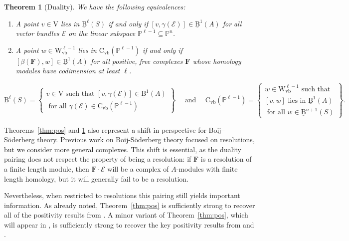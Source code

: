 \documentclass[12pt]{amsart}
\newtheorem{thm}[lemma]{Theorem}
\theoremstyle{definition}
\theoremstyle{remark}
\newcommand{\PP}{\mathbb{P}}
\newcommand{\VV}{\mathrm{V}}
\newcommand{\Wvb}{\mathrm{W}_{\text{vb}}}
\newcommand{\cE}{\mathcal{E}}
\newcommand{\FF}{\mathbf{F}}
\newcommand{\CvbQ}{\mathrm{C}_{\text{vb}}}
\newcommand{\BBQ}{\underline{\mathrm{B}}}
\begin{document}
\begin{thm}[Duality]\label{thm:dual}
We have the following equivalences:
\begin{enumerate}
	\item  A point $v\in \VV$ lies in $\BBQ^{\ell}(S)$ if and only if $[v,\gamma(\cE)]\in \BBQ^1(A)$ for all vector bundles $\cE$ on the linear subspace $\PP^{\ell-1}\subseteq \PP^n$.
	\item  A point $w\in \Wvb^{\ell-1}$ lies in $\CvbQ(\PP^{\ell-1})$ if and only if $[\beta(\FF),w]\in \BBQ^1(A)$ for all positive, free complexes $\FF$ whose homology modules have codimension at least $\ell$.
\end{enumerate}
\[
\BBQ^{\ell}(S)
=\left\{ \begin{matrix} v\in \VV  \text{ such that } [v,\gamma(\cE)]\in \BBQ^1(A) \\ \text{ for all } \gamma(\cE)\in \CvbQ(\PP^{\ell-1})\end{matrix} \right\}
\quad
\text{ and }
\quad
\CvbQ(\PP^{\ell-1})=\left\{ \begin{matrix} w\in \Wvb ^{\ell-1} \text{ such that }  \\ [v,w] \text{ lies in } \BBQ^1(A) \\  \text{ for all } w\in \BBQ^{n+1}(S)\end{matrix} \right\}.
\]
\end{thm}

Theorems~\ref{thm:pos} and \ref{thm:dual} also represent a shift in perspective for Boij--S\"oderberg theory.  Previous work on Boij-S\"oderberg theory focused on resolutions, but we consider more general complexes.  This shift is essential, as the duality pairing does not respect the property of being a resolution: if $\FF$ is a resolution of a finite length module, then $\FF\cdot \cE$ will be a complex of $A$-modules with finite length homology, but it will generally fail to be a resolution.  

Nevertheless, when restricted to resolutions this pairing still yields important information.  As already noted, Theorem~\ref{thm:pos} is sufficiently strong to recover all of the positivity results from \cite{eis-schrey1}.  A minor variant of Theorem~\ref{thm:pos}, which will appear in \cite{eis-erm-refined}, is sufficiently strong to recover the key positivity results from \cite{boij-sod2} and \cite{eis-schrey2}.
\end{document}
